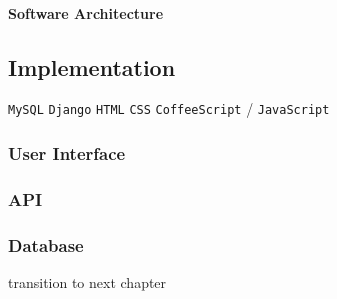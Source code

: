 \paragraph{Software Architecture} %
\label{par:software_architecture}




\subsection{Implementation} %
\label{sub:implementation}

\texttt{MySQL}
\texttt{Django}
\texttt{HTML}
\texttt{CSS}
\texttt{CoffeeScript} / \texttt{JavaScript}

\subsubsection{User Interface} %
\label{ssub:user_interface}

\subsubsection{API} %
\label{ssub:api}

\subsubsection{Database} %
\label{ssub:database}



\vspace{2em}
transition to next chapter

